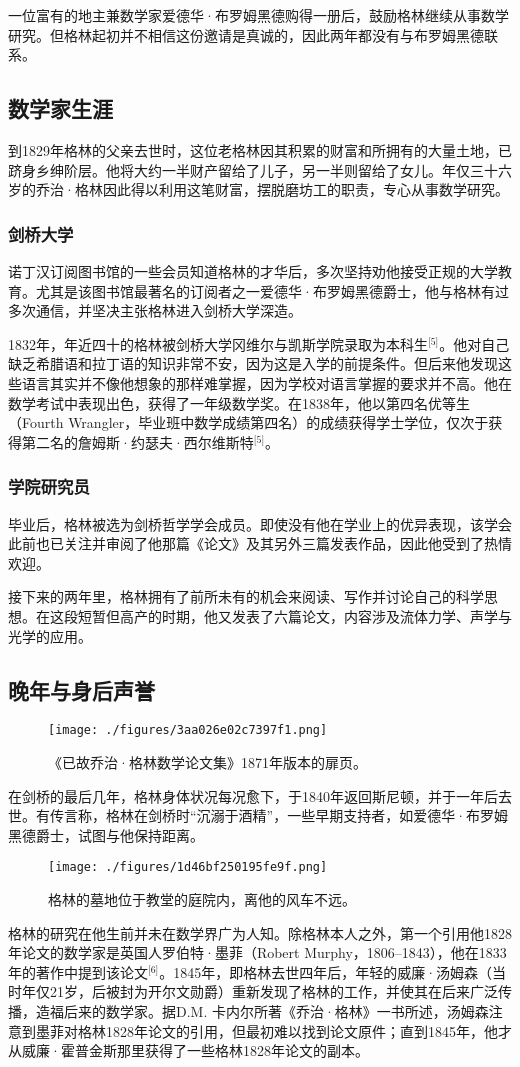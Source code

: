 一位富有的地主兼数学家爱德华·布罗姆黑德购得一册后，鼓励格林继续从事数学研究。但格林起初并不相信这份邀请是真诚的，因此两年都没有与布罗姆黑德联系。
\subsection{数学家生涯}
到1829年格林的父亲去世时，这位老格林因其积累的财富和所拥有的大量土地，已跻身乡绅阶层。他将大约一半财产留给了儿子，另一半则留给了女儿。年仅三十六岁的乔治·格林因此得以利用这笔财富，摆脱磨坊工的职责，专心从事数学研究。
\subsubsection{剑桥大学}
诺丁汉订阅图书馆的一些会员知道格林的才华后，多次坚持劝他接受正规的大学教育。尤其是该图书馆最著名的订阅者之一爱德华·布罗姆黑德爵士，他与格林有过多次通信，并坚决主张格林进入剑桥大学深造。

1832年，年近四十的格林被剑桥大学冈维尔与凯斯学院录取为本科生\(^\text{[5]}\)。他对自己缺乏希腊语和拉丁语的知识非常不安，因为这是入学的前提条件。但后来他发现这些语言其实并不像他想象的那样难掌握，因为学校对语言掌握的要求并不高。他在数学考试中表现出色，获得了一年级数学奖。在1838年，他以第四名优等生（Fourth Wrangler，毕业班中数学成绩第四名）的成绩获得学士学位，仅次于获得第二名的詹姆斯·约瑟夫·西尔维斯特\(^\text{[5]}\)。
\subsubsection{学院研究员}
毕业后，格林被选为剑桥哲学学会成员。即使没有他在学业上的优异表现，该学会此前也已关注并审阅了他那篇《论文》及其另外三篇发表作品，因此他受到了热情欢迎。

接下来的两年里，格林拥有了前所未有的机会来阅读、写作并讨论自己的科学思想。在这段短暂但高产的时期，他又发表了六篇论文，内容涉及流体力学、声学与光学的应用。
\subsection{晚年与身后声誉}
\begin{figure}[ht]
\centering
\texttt{[image: ./figures/3aa026e02c7397f1.png]}
\caption{《已故乔治·格林数学论文集》1871年版本的扉页。} \label{fig_QZgl_3}
\end{figure}
在剑桥的最后几年，格林身体状况每况愈下，于1840年返回斯尼顿，并于一年后去世。有传言称，格林在剑桥时“沉溺于酒精”，一些早期支持者，如爱德华·布罗姆黑德爵士，试图与他保持距离。
\begin{figure}[ht]
\centering
\texttt{[image: ./figures/1d46bf250195fe9f.png]}
\caption{格林的墓地位于教堂的庭院内，离他的风车不远。} \label{fig_QZgl_4}
\end{figure}
格林的研究在他生前并未在数学界广为人知。除格林本人之外，第一个引用他1828年论文的数学家是英国人罗伯特·墨菲（Robert Murphy，1806–1843），他在1833年的著作中提到该论文\(^\text{[6]}\)。1845年，即格林去世四年后，年轻的威廉·汤姆森（当时年仅21岁，后被封为开尔文勋爵）重新发现了格林的工作，并使其在后来广泛传播，造福后来的数学家。据D.M. 卡内尔所著《乔治·格林》一书所述，汤姆森注意到墨菲对格林1828年论文的引用，但最初难以找到论文原件；直到1845年，他才从威廉·霍普金斯那里获得了一些格林1828年论文的副本。

